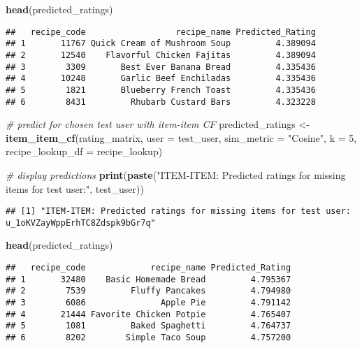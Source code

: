 \documentclass[
]{article}
\newenvironment{Shaded}{\begin{snugshade}}{\end{snugshade}}
\newcommand{\AttributeTok}[1]{\textcolor[rgb]{0.13,0.29,0.53}{#1}}
\newcommand{\CommentTok}[1]{\textcolor[rgb]{0.56,0.35,0.01}{\textit{#1}}}
\newcommand{\DecValTok}[1]{\textcolor[rgb]{0.00,0.00,0.81}{#1}}
\newcommand{\FunctionTok}[1]{\textcolor[rgb]{0.13,0.29,0.53}{\textbf{#1}}}
\newcommand{\NormalTok}[1]{#1}
\newcommand{\OtherTok}[1]{\textcolor[rgb]{0.56,0.35,0.01}{#1}}
\newcommand{\StringTok}[1]{\textcolor[rgb]{0.31,0.60,0.02}{#1}}
\begin{document}
\begin{Shaded}
\begin{Highlighting}[]
\FunctionTok{head}\NormalTok{(predicted\_ratings)}
\end{Highlighting}
\end{Shaded}

\begin{verbatim}
##   recipe_code                  recipe_name Predicted_Rating
## 1       11767 Quick Cream of Mushroom Soup         4.389094
## 2       12540    Flavorful Chicken Fajitas         4.389094
## 3        3309       Best Ever Banana Bread         4.335436
## 4       10248       Garlic Beef Enchiladas         4.335436
## 5        1821       Blueberry French Toast         4.335436
## 6        8431         Rhubarb Custard Bars         4.323228
\end{verbatim}

\begin{Shaded}
\begin{Highlighting}[]
\CommentTok{\# predict for chosen test user with item{-}item CF}
\NormalTok{predicted\_ratings }\OtherTok{\textless{}{-}} \FunctionTok{item\_item\_cf}\NormalTok{(rating\_matrix, }\AttributeTok{user =}\NormalTok{ test\_user, }
                                  \AttributeTok{sim\_metric =} \StringTok{"Cosine"}\NormalTok{, }\AttributeTok{k =} \DecValTok{5}\NormalTok{, }
                                  \AttributeTok{recipe\_lookup\_df =}\NormalTok{ recipe\_lookup)}

\CommentTok{\# display predictions}
\FunctionTok{print}\NormalTok{(}\FunctionTok{paste}\NormalTok{(}\StringTok{"ITEM{-}ITEM: Predicted ratings for missing items for test user:"}\NormalTok{, test\_user))}
\end{Highlighting}
\end{Shaded}

\begin{verbatim}
## [1] "ITEM-ITEM: Predicted ratings for missing items for test user: u_1oKVZayWppErhTC8Zdspk9bGr7q"
\end{verbatim}

\begin{Shaded}
\begin{Highlighting}[]
\FunctionTok{head}\NormalTok{(predicted\_ratings)}
\end{Highlighting}
\end{Shaded}

\begin{verbatim}
##   recipe_code             recipe_name Predicted_Rating
## 1       32480    Basic Homemade Bread         4.795367
## 2        7539         Fluffy Pancakes         4.794980
## 3        6086               Apple Pie         4.791142
## 4       21444 Favorite Chicken Potpie         4.765407
## 5        1081         Baked Spaghetti         4.764737
## 6        8202        Simple Taco Soup         4.757200
\end{verbatim}
\end{document}
